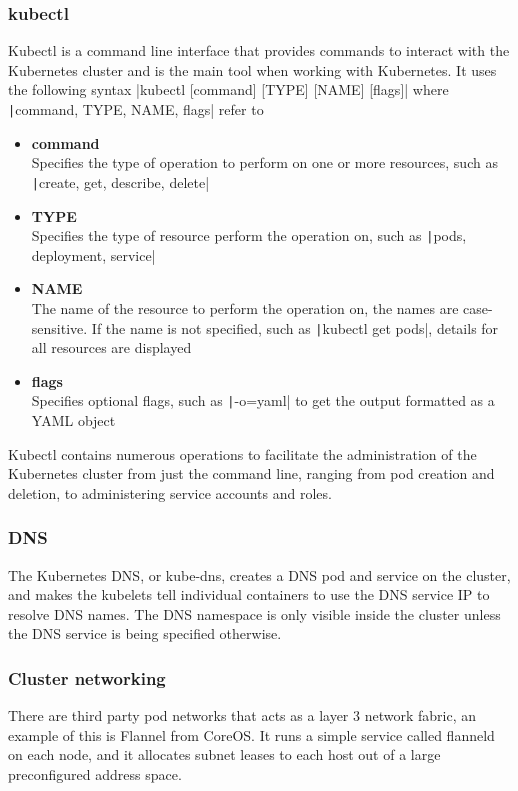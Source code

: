\documentclass[../main.tex]{subfiles}
\begin{document}
\subsubsection*{kubectl}
Kubectl is a command line interface that provides commands to interact with the Kubernetes cluster and is the main tool when working with Kubernetes. It uses the following syntax 
|kubectl [command] [TYPE] [NAME] [flags]|
where \texttt|command, TYPE, NAME, flags| refer to 
\begin{itemize}
    \item\textbf{command}\\
            Specifies the type of operation to perform on one or more resources, such as\\ \texttt|create, get, describe, delete|
    \item\textbf{TYPE}\\
            Specifies the type of resource perform the operation on, such as \texttt|pods, deployment, service|
    \item\textbf{NAME}\\
            The name of the resource to perform the operation on, the names are case-sensitive. If the name is not specified, such as \texttt|kubectl get pods|, details for all resources are displayed
    \item\textbf{flags}\\
            Specifies optional flags, such as \texttt|-o=yaml| to get the output formatted as a YAML object
\end{itemize}
Kubectl contains numerous operations to facilitate the administration of the Kubernetes cluster from just the command line, ranging from pod creation and deletion, to administering service accounts and roles. \cite{kubernetes_kubectl}

\subsubsection*{DNS}
The Kubernetes DNS, or kube-dns, creates a DNS pod and service on the cluster, and makes the kubelets tell individual containers to use the DNS service IP to resolve DNS names. The DNS namespace is only visible inside the cluster unless the DNS service is being specified otherwise. \cite{kubernetes_dns}

\subsubsection*{Cluster networking}
There are third party pod networks that acts as a layer 3 network fabric, an example of this is Flannel from CoreOS. \cite{coreos_flannel}  It runs a simple service called flanneld on each node, and it allocates subnet leases to each host out of a large preconfigured address space.
\end{document}
